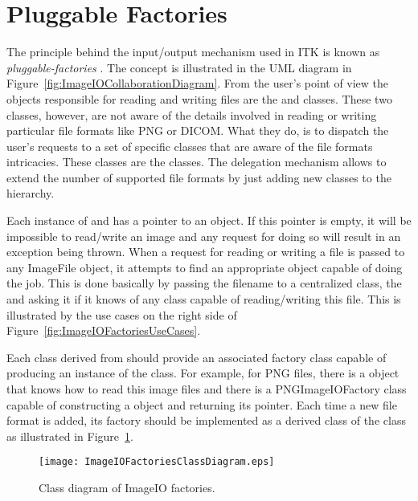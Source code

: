 \section{Pluggable Factories}
\label{sec:ImageIOPluggableFactories}

The principle behind the input/output mechanism used in ITK is known as
\emph{pluggable-factories} \cite{Gamma1995}. The concept is illustrated in the
UML diagram in Figure~\ref{fig:ImageIOCollaborationDiagram}. From the user's
point of view the objects responsible for reading and writing files are the
 and  classes. These two
classes, however, are not aware of the details involved in reading or writing
particular file formats like PNG or DICOM.  What they do, is to dispatch the
user's requests to a set of specific classes that are aware of the file formats
intricacies. These classes are the  classes. The delegation
mechanism allows to extend the number of supported file formats by just adding
new classes to the  hierarchy.

Each instance of  and 
has a pointer to an  object. If this pointer is empty, it will be
impossible to read/write an image and any request for doing so will result in
an exception being thrown. When a request for reading or writing a file is
passed to any ImageFile object, it attempts to find an appropriate
 object capable of doing the job. This is done basically by
passing the filename to a centralized class, the  and
asking it if it knows of any  class capable of reading/writing
this file. This is illustrated by the use cases on the right side of
Figure~\ref{fig:ImageIOFactoriesUseCases}.

Each class derived from  should provide an associated
factory class capable of producing an instance of the  class. For
example, for PNG files, there is a  object that knows how
to read this image files and there is a PNGImageIOFactory class capable of
constructing a  object and returning its pointer. Each time a
new file format is added, its factory should be implemented as a derived class
of the  class as illustrated in
Figure~\ref{fig:ImageIOFactoriesClassDiagram}. 

\begin{figure}
\center
\texttt{[image: ImageIOFactoriesClassDiagram.eps]}
\caption{Class diagram of ImageIO factories.}
\label{fig:ImageIOFactoriesClassDiagram}
\end{figure}

